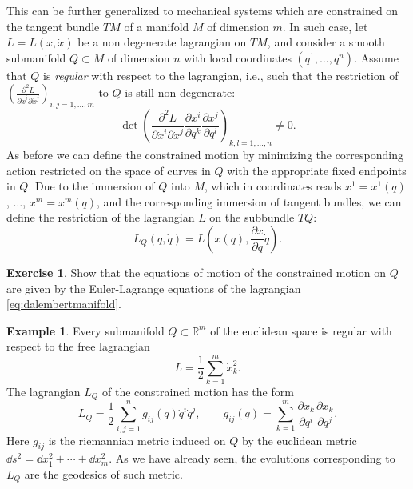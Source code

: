 \documentclass[english,fontsize=11pt,paper=b5]{scrbook}
\numberwithin{equation}{chapter}
\theoremstyle{definition}
\newtheorem{example}{Example}[chapter]
\newtheorem{exercise}{Exercise}[chapter]
\begin{document}
    This can be further generalized to mechanical systems which are constrained on the tangent bundle $TM$ of a manifold $M$ of dimension $m$.
    In such case, let  $L=L(x,\dot x)$ be a non degenerate lagrangian on $TM$, and consider a smooth submanifold $Q\subset M$ of dimension $n$ with local coordinates $(q^1,\ldots,q^n)$.
    Assume that $Q$ is \emph{regular} with respect to the lagrangian, i.e., such that the restriction of $\left(\frac{\partial^2 L}{\partial \dot x^i \partial\dot x^j}\right)_{i,j=1,\ldots,m}$ to $Q$ is still non degenerate:
    \begin{equation}
      \det\left(\frac{\partial^2 L}{\partial \dot x^i \partial\dot x^j}\frac{\partial x^i}{\partial q^k}\frac{\partial x^j}{\partial q^l}\right)_{k,l=1,\ldots,n} \neq 0.
    \end{equation}
    As before we can define the constrained motion by minimizing the corresponding action restricted on the space of curves in $Q$ with the appropriate fixed endpoints in $Q$. Due to the immersion of $Q$ into $M$, which in coordinates reads $x^1 = x^1(q)$, $\ldots$, $x^m=x^m(q)$, and the corresponding immersion of tangent bundles, we can define the restriction of the lagrangian $L$ on the subbundle $TQ$:
    \begin{equation}\label{eq:dalembertmanifold}
      L_Q(q,\dot q) = L\left(x(q), \frac{\partial x}{\partial q}\dot q\right).
    \end{equation}

    \begin{exercise}
      Show that the equations of motion of the constrained motion on $Q$ are given by the Euler-Lagrange equations of the lagrangian \eqref{eq:dalembertmanifold}.
    \end{exercise}

    \begin{example}
      Every submanifold $Q\subset \mathbb{R}^m$ of the euclidean space is regular with respect to the free lagrangian
      \begin{equation}
        L = \frac12 \sum_{k=1}^m \dot x^2_k.
      \end{equation}
      The lagrangian $L_Q$ of the constrained motion has the form
      \begin{equation}
        L_Q = \frac12 \sum_{i,j=1}^n g_{ij}(q)\dot q^i\dot q^j, \qquad g_{ij}(q) = \sum_{k=1}^m \frac{\partial x_k}{\partial q^i}\frac{\partial x_k}{\partial q^j}.
      \end{equation}
      Here $g_{ij}$ is the riemannian metric induced on $Q$ by the euclidean metric $\dd s^2 = \dd x_1^2 + \cdots + \dd x_m^2$.
      As we have already seen, the evolutions corresponding to $L_Q$ are the geodesics of such metric.
    \end{example}
\end{document}
